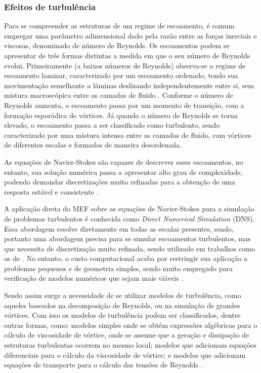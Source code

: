 \subsubsection{Efeitos de turbulência} \label{MT}

Para se compreender as estruturas de um regime de escoamento, é comum empregar uma parâmetro adimensional dado pela razão entre as forças inerciais e viscosas, denominado de número de Reynolds. Os escoamentos podem se apresentar de três formas distintas a medida em que o seu número de Reynolds evolui. Primeiramente (a baixos números de Reynolds) observa-se o regime de escoamento laminar, caracterizado por um escoamento ordenado, tendo sua movimentação semelhante a lâminas deslizando independentemente entre si, sem mistura macroscópica entre as camadas de fluido \cite{popiolek2005analise,shaughnessy2005introduction}. Conforme o número de Reynolds aumenta, o escoamento passa por um momento de transição, com a formação esporádica de vórtices. Já quando o número de Reynolds se torna elevado, o escoamento passa a ser classificado como turbulento, sendo caracterizado por uma mistura intensa entre as camadas de fluido, com vórtices de diferentes escalas e formados de maneira desordenada.

As equações de Navier-Stokes são capazes de descrever esses escoamentos, no entanto, sua solução numérica passa a apresentar alto grau de complexidade, podendo demandar discretizações muito refinadas para a obtenção de uma resposta estável e consistente \cite{neto2002fundamentos}.

A aplicação direta do MEF sobre as equações de Navier-Stokes para a simulação de problemas turbulentos é conhecida como \textit{Direct Numerical Simulation} (DNS). Essa abordagem resolve diretamente em todas as escalas presentes, sendo, portanto uma abordagem precisa para se simular escoamentos turbulentos, mas que necessita de discretização muito refinada, sendo utilizado em trabalhos como os de . No entanto, o custo computacional acaba por restringir sua aplicação a problemas pequenos e de geometria simples, sendo muito empregado para verificação de modelos numéricos que sejam mais viáveis \cite{piomelli1999large,yokokawa200216}.

Sendo assim surge a necessidade de se utilizar modelos de turbulência, como aqueles baseados na decomposição de Reynolds, ou na simulação de grandes vórtices. Com isso os modelos de turbulência podem ser classificados, dentre outras formas, como: modelos simples onde se obtém expressões algébricas para o cálculo de viscosidade de vórtice, onde se assume que a geração e dissipação de estruturas turbulentas ocorrem no mesmo local; modelos que adicionam equações diferenciais para o cálculo da viscosidade de vórtice; e modelos que adicionam equações de transporte para o cálculo das tensões de Reynolds \cite{souza2011revisao,alfonsi2009reynolds,teixeira2001simulaccao}.

